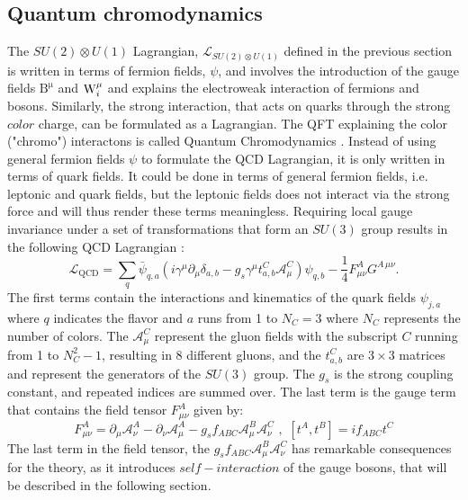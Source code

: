 \subsection*{Quantum chromodynamics} 
\noindent\justify
The $SU(2)\otimes U(1)$ Lagrangian, $\mathcal{L}_{SU(2)\otimes U(1)}$ defined in the previous section is written in terms of fermion fields, $\psi$, and involves the introduction of the gauge fields $\mathrm{B^{\mu}}$ and $\mathrm{W}_{i}^{\mu}$ and explains the electroweak interaction of fermions and bosons.  
Similarly, the strong interaction, that acts on quarks through the strong $color$ charge, can be formulated as a Lagrangian. 
The QFT explaining the color ("chromo") interactons is called Quantum Chromodynamics \cite{Han:1965pf,GellMann:1962xb,Greenberg:1964pe}. 
Instead of using general fermion fields $\psi$ to formulate the QCD Lagrangian, it is only written in terms of quark fields. 
It could be done in terms of general fermion fields, i.e. leptonic and quark fields, but the leptonic fields does not interact via the strong force and will thus render these terms meaningless.
Requiring local gauge invariance under a set of transformations that form an $SU(3)$ group results in the following QCD Lagrangian \cite{PhysRevD.98.030001}:
\begin{equation}  
\mathcal{L}_{\mathrm{QCD}}=\sum_{q}\bar{\psi}_{q,a}(i\gamma^{\mu}\partial_{\mu}\delta_{a,b}-g_{s}\gamma^{\mu}t_{a,b}^{C}\mathcal{A}_{\mu}^{C})\psi_{q,b}-\frac{1}{4}F_{\mu\nu}^{A}G^{A\,\mu\nu}.
\end{equation} 
The first terms contain the interactions and kinematics of the quark fields $\psi_{j,a}$ where $q$ indicates the flavor and $a$ runs from 1 to $N_{C}=3$ where $N_{C}$ represents the number of colors.
The $\mathcal{A}_{\mu}^{C}$ represent the gluon fields with the subscript $C$ running from 1 to $N_{C}^{2}-1$, resulting in 8 different gluons, and the $t_{a,b}^{C}$ are $3\times3$ matrices and represent the generators of the $SU(3)$ group.
The $g_{s}$ is the strong coupling constant, and repeated indices are summed over.
The last term is the gauge term that contains the field tensor $F_{\mu\nu}^{A}$ given by:
\begin{equation}  
F_{\mu\nu}^{A}=\partial_{\mu}\mathcal{A}_{\nu}^{A}-\partial_{\nu}\mathcal{A}_{\mu}^{A}-g_{s}f_{ABC}\mathcal{A}_{\mu}^{B}\mathcal{A}_{\nu}^{C}\,\, , \,\, [t^{A},t^{B}]=i f_{ABC}t^{C} 
\label{eq:fst}
\end{equation}  
The last term in the field tensor, the $g_{s}f_{ABC}\mathcal{A}_{\mu}^{B}\mathcal{A}_{\nu}^{C}$ has remarkable consequences for the theory, as it introduces $self-interaction$ of the gauge bosons, that will be described in the following section.
